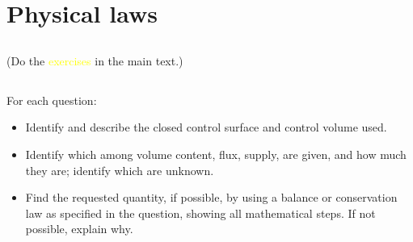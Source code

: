 \documentclass[a4paper,12pt,%
onecolumn,oneside,%
british%
]{memoir}
\newcommand{\elabel}[1]{\label{#1}\marginpar{\vspace{-1.3\baselineskip}\hspace{-8em}\footnotesize Solution p.~\pageref{#1_sol}}}
\renewcommand*{\|}[1][]{\nonscript\:#1\vert\nonscript\:\mathopen{}}
\begin{document}




\printpagenotes*
\cleartooddpage
\chapter{Physical laws}
\label{cha:laws}
\setcounter{section}{-1}

\section{}
(Do the \textcolor{yellow}{exercises} in the main text.)



\section{}\elabel{sec:calc_from_bal}

For each question:
\begin{itemize}[nosep,label=]
\item Identify and describe the closed control surface and control volume used.
\item Identify which among volume content, flux, supply, are given, and how much they are; identify which are unknown.
\item Find the requested quantity, if possible, by using a balance or conservation law as specified in the question, showing all mathematical steps. If not possible, explain why.
\end{itemize}
\end{document}
